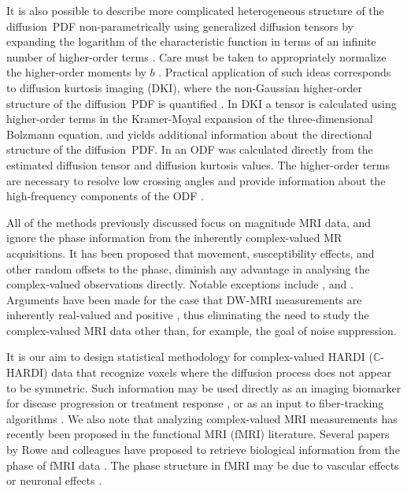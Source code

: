 \documentclass[authoryear,preprint,12pt]{elsarticle}
\newcommand{\bbC}{\mathbb{C}}
\begin{document}
It is also possible to describe more complicated heterogeneous
structure of the diffusion~PDF non-parametrically using generalized
diffusion tensors by expanding the logarithm of the characteristic
function in terms of an infinite number of higher-order terms
\citep{Ozarslan03,Liu2005,Liu2004}.  Care must be taken to
appropriately normalize the higher-order moments by $b$
\cite{Liu2005}.  Practical application of such ideas corresponds to
diffusion kurtosis imaging (DKI), where the non-Gaussian higher-order
structure of the diffusion~PDF is quantified
\citep{Jensen2005,Lu2006,Hui2008}.  In DKI a tensor is calculated
using higher-order terms in the Kramer-Moyal expansion of the
three-dimensional Bolzmann equation, and yields additional information
about the directional structure of the diffusion~PDF.  In
\citet{Lazar} an ODF was calculated directly from the estimated
diffusion tensor and diffusion kurtosis values.
The higher-order terms are necessary to resolve low crossing angles
and provide information about the high-frequency components of the ODF
\citep{laz:mapping}.

All of the methods previously discussed
focus on magnitude MRI data, and ignore the phase information from the
inherently complex-valued MR acquisitions.  It has been proposed that
movement, susceptibility effects, and other random offsets to the
phase, diminish any advantage in analysing the complex-valued
observations directly.  Notable exceptions include \citet{Liu2005},
\citet{Aksoyetal2008} and \citet{Newbould}.  Arguments have been made
for the case that DW-MRI measurements are inherently real-valued and
positive \citep{Wedeen05}, thus eliminating the need to study the
complex-valued MRI data other than, for example, the goal of noise
suppression.

It is our aim to design statistical methodology for complex-valued
HARDI ($\bbC$-HARDI) data that recognize voxels where the diffusion
process does not appear to be symmetric.  Such information may be used
directly as an imaging biomarker for disease progression or treatment
response \citep{whi-mat:pitfalls}, or as an input to fiber-tracking
algorithms \citep{laz:mapping,chu-cho-che:principles}.  We also note
that analyzing complex-valued MRI measurements has recently been
proposed in the functional MRI (fMRI) literature.  Several papers by
Rowe and colleagues have proposed to retrieve biological information
from the phase of fMRI data \citep{Rowe2004,Rowe2005,Rowe2007}.  The
phase structure in fMRI may be due to vascular effects \citep{Menon}
or neuronal effects \citep{Bodurka}.
\end{document}
